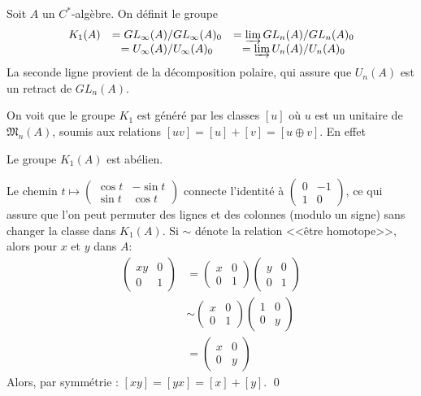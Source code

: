 \begin{definition}
Soit $A$ un $C^*$-algèbre. On définit le groupe
\[\begin{array}{ccc}K_1(A) &= GL_\infty(A)/GL_\infty(A)_0 & = \varinjlim GL_n(A)/GL_n(A)_0 \\
			& = U_\infty(A)/U_\infty(A)_0 & = \varinjlim U_n(A)/U_n(A)_0 
\end{array}\] La seconde ligne provient de la décomposition polaire, qui assure que $U_n(A)$ est un retract de $GL_n(A)$.
\end{definition}

On voit que le groupe $K_1$ est généré par les classes $[u]$ où $u$ est un unitaire de $\mathfrak M_n(A)$, soumis aux relations $[uv]=[u]+[v]=[u\oplus v]$. En effet
\begin{prop}Le groupe $K_1(A)$ est abélien.\end{prop}
\begin{dem}
Le chemin $t\mapsto \begin{pmatrix}\cos t & -\sin t \\ \sin t & \cos t \end{pmatrix}$ connecte l'identité à $\begin{pmatrix}0& -1 \\ 1 & 0\end{pmatrix}$, ce qui assure que l'on peut permuter des lignes et des colonnes (modulo un signe) sans changer la classe dans $K_1(A)$. Si $\sim$ dénote la relation <<être homotope>>, alors pour $x$ et $y$ dans $A$:
\begin{align*}
\begin{pmatrix}xy & 0 \\ 0 & 1\end{pmatrix} & = \begin{pmatrix}x & 0 \\ 0 & 1\end{pmatrix}\begin{pmatrix}y & 0 \\ 0 & 1\end{pmatrix} \\
						&\sim \begin{pmatrix}x & 0 \\ 0 & 1\end{pmatrix}\begin{pmatrix} 1 & 0 \\ 0 & y \end{pmatrix}\\
					& =\begin{pmatrix} x& 0 \\ 0 & y\end{pmatrix}
\end{align*}
Alors, par symmétrie : $[xy]=[yx]=[x]+[y]$.
\qed
\end{dem}

